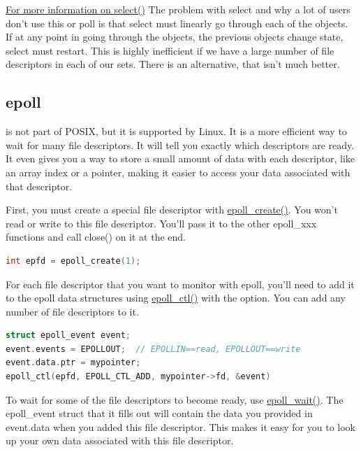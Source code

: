 \href{http://pubs.opengroup.org/onlinepubs/9699919799/functions/select.html}{For more information on select()}
The problem with select and why a lot of users don't use this or poll is that select must linearly go through each of the objects.
If at any point in going through the objects, the previous objects change state, select must restart.
This is highly inefficient if we have a large number of file descriptors in each of our sets.
There is an alternative, that isn't much better.

\subsection{epoll}

 is not part of POSIX, but it is supported by Linux.
It is a more efficient way to wait for many file descriptors.
It will tell you exactly which descriptors are ready.
It even gives you a way to store a small amount of data with each descriptor, like an array index or a pointer, making it easier to access your data associated with that descriptor.

First, you must create a special file descriptor with \href{http://linux.die.net/man/2/epoll_create}{epoll\_create()}.
You won't read or write to this file descriptor.
You'll pass it to the other epoll\_xxx functions and call close() on it at the end.

\begin{lstlisting}[language=C]
int epfd = epoll_create(1);
\end{lstlisting}

For each file descriptor that you want to monitor with epoll, you'll need to add it to the epoll data structures using \href{http://linux.die.net/man/2/epoll_ctl}{epoll\_ctl()} with the  option.
You can add any number of file descriptors to it.

\begin{lstlisting}[language=C]
struct epoll_event event;
event.events = EPOLLOUT;  // EPOLLIN==read, EPOLLOUT==write
event.data.ptr = mypointer;
epoll_ctl(epfd, EPOLL_CTL_ADD, mypointer->fd, &event)
\end{lstlisting}

To wait for some of the file descriptors to become ready, use \href{http://linux.die.net/man/2/epoll_wait}{epoll\_wait()}.
The epoll\_event struct that it fills out will contain the data you provided in event.data when you added this file descriptor.
This makes it easy for you to look up your own data associated with this file descriptor.

